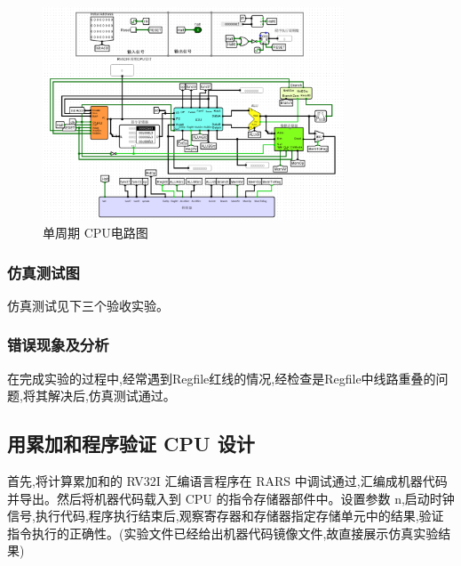\documentclass{article}
\begin{document}
    \begin{figure}[H]
    \centering
    \includegraphics[width=0.8\textwidth]{2.4.2.png}
    \caption{单周期 CPU电路图}
    \end{figure}

    \subsubsection{仿真测试图}
    仿真测试见下三个验收实验。

   

    \subsubsection{错误现象及分析}
    在完成实验的过程中,经常遇到Regfile红线的情况,经检查是Regfile中线路重叠的问题,将其解决后,仿真测试通过。

    \subsection{用累加和程序验证 CPU 设计}
    首先,将计算累加和的 RV32I 汇编语言程序在 RARS 中调试通过,汇编成机器代码并导出。然后将机器代码载入到 CPU 的指令存储器部件中。设置参数 n,启动时钟信号,执行代码,程序执行结束后,观察寄存器和存储器指定存储单元中的结果,验证指令执行的正确性。(实验文件已经给出机器代码镜像文件,故直接展示仿真实验结果)
\end{document}
